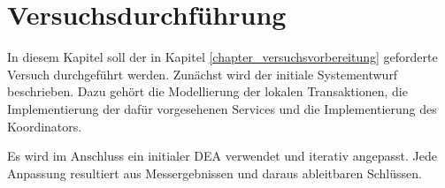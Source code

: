 \chapter{Versuchsdurchführung} \label{chapter_versuchsdurchführung}

In diesem Kapitel soll der in Kapitel \ref{chapter_versuchsvorbereitung} geforderte Versuch durchgeführt werden. Zunächst wird der initiale Systementwurf beschrieben. Dazu gehört die Modellierung der lokalen Transaktionen, die Implementierung der dafür vorgesehenen Services und die Implementierung des Koordinators.

Es wird im Anschluss ein initialer DEA verwendet und iterativ angepasst. Jede Anpassung resultiert aus Messergebnissen und daraus ableitbaren Schlüssen.





















